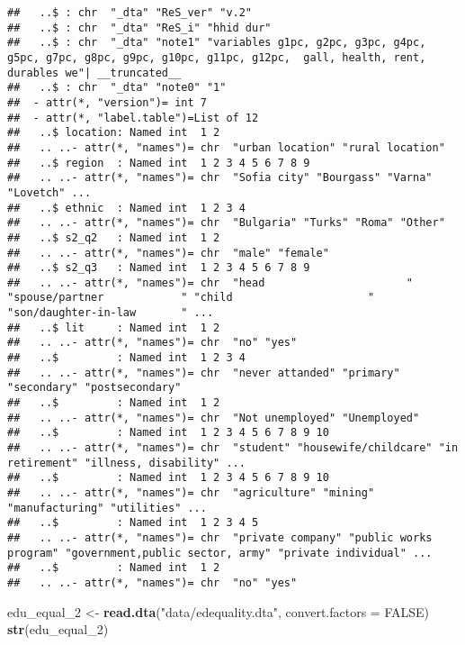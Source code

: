 \documentclass[]{article}
\newenvironment{Shaded}{\begin{snugshade}}{\end{snugshade}}
\newcommand{\KeywordTok}[1]{\textcolor[rgb]{0.13,0.29,0.53}{\textbf{#1}}}
\newcommand{\DataTypeTok}[1]{\textcolor[rgb]{0.13,0.29,0.53}{#1}}
\newcommand{\DecValTok}[1]{\textcolor[rgb]{0.00,0.00,0.81}{#1}}
\newcommand{\StringTok}[1]{\textcolor[rgb]{0.31,0.60,0.02}{#1}}
\newcommand{\OtherTok}[1]{\textcolor[rgb]{0.56,0.35,0.01}{#1}}
\newcommand{\NormalTok}[1]{#1}
\begin{document}
\begin{verbatim}
##   ..$ : chr  "_dta" "ReS_ver" "v.2"
##   ..$ : chr  "_dta" "ReS_i" "hhid dur"
##   ..$ : chr  "_dta" "note1" "variables g1pc, g2pc, g3pc, g4pc, g5pc, g7pc, g8pc, g9pc, g10pc, g11pc, g12pc,  gall, health, rent, durables we"| __truncated__
##   ..$ : chr  "_dta" "note0" "1"
##  - attr(*, "version")= int 7
##  - attr(*, "label.table")=List of 12
##   ..$ location: Named int  1 2
##   .. ..- attr(*, "names")= chr  "urban location" "rural location"
##   ..$ region  : Named int  1 2 3 4 5 6 7 8 9
##   .. ..- attr(*, "names")= chr  "Sofia city" "Bourgass" "Varna" "Lovetch" ...
##   ..$ ethnic  : Named int  1 2 3 4
##   .. ..- attr(*, "names")= chr  "Bulgaria" "Turks" "Roma" "Other"
##   ..$ s2_q2   : Named int  1 2
##   .. ..- attr(*, "names")= chr  "male" "female"
##   ..$ s2_q3   : Named int  1 2 3 4 5 6 7 8 9
##   .. ..- attr(*, "names")= chr  "head                      " "spouse/partner            " "child                     " "son/daughter-in-law       " ...
##   ..$ lit     : Named int  1 2
##   .. ..- attr(*, "names")= chr  "no" "yes"
##   ..$         : Named int  1 2 3 4
##   .. ..- attr(*, "names")= chr  "never attanded" "primary" "secondary" "postsecondary"
##   ..$         : Named int  1 2
##   .. ..- attr(*, "names")= chr  "Not unemployed" "Unemployed"
##   ..$         : Named int  1 2 3 4 5 6 7 8 9 10
##   .. ..- attr(*, "names")= chr  "student" "housewife/childcare" "in retirement" "illness, disability" ...
##   ..$         : Named int  1 2 3 4 5 6 7 8 9 10
##   .. ..- attr(*, "names")= chr  "agriculture" "mining" "manufacturing" "utilities" ...
##   ..$         : Named int  1 2 3 4 5
##   .. ..- attr(*, "names")= chr  "private company" "public works program" "government,public sector, army" "private individual" ...
##   ..$         : Named int  1 2
##   .. ..- attr(*, "names")= chr  "no" "yes"
\end{verbatim}

\begin{Shaded}
\begin{Highlighting}[]
\NormalTok{edu_equal_}\DecValTok{2}\NormalTok{ <-}\StringTok{ }\KeywordTok{read.dta}\NormalTok{(}\StringTok{"data/edequality.dta"}\NormalTok{, }\DataTypeTok{convert.factors =} \OtherTok{FALSE}\NormalTok{)}
\KeywordTok{str}\NormalTok{(edu_equal_}\DecValTok{2}\NormalTok{)}
\end{Highlighting}
\end{Shaded}
\end{document}
